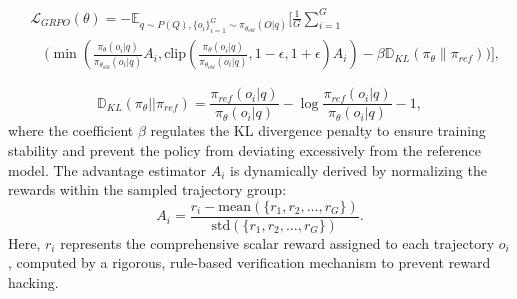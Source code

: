 \documentclass{article}
\begin{document}

\begin{equation}
\begin{aligned}
    &\mathcal{L}_{GRPO}(\theta) = -\mathbb{E}_{q \sim P(Q), \{o_i\}_{i=1}^{G} \sim \pi_{\theta_{old}}(O|q)} \Bigg[ \frac{1}{G} \sum_{i=1}^G \\
    &\quad \Bigg( \min\left( \frac{\pi_\theta(o_i|q)}{\pi_{\theta_{old}}(o_i|q)} A_i, \text{clip}\left(\frac{\pi_\theta(o_i|q)}{\pi_{\theta_{old}}(o_i|q)}, 1-\epsilon, 1+\epsilon\right) A_i \right) - \beta \mathbb{D}_{KL}(\pi_\theta \| \pi_{ref}) \Bigg) \Bigg],
\end{aligned}
\end{equation}


\begin{equation}
\mathbb{D}_{KL}(\pi_\theta||\pi_{ref}) = \frac{\pi_{ref}(o_i|q)}{\pi_\theta(o_i|q)} - \log \frac{\pi_{ref}(o_i|q)}{\pi_\theta(o_i|q)} - 1, 
\end{equation}
where the coefficient $ \beta $ regulates the KL divergence penalty to ensure training stability and prevent the policy from deviating excessively from the reference model. The advantage estimator $ A_{i} $ is dynamically derived by normalizing the rewards within the sampled trajectory group:  
\begin{equation}
A_{i} = \frac{r_i - \text{mean}(\{r_1, r_2, \dots, r_G\})}{\text{std}(\{r_1, r_2, \dots, r_G\})}.
\end{equation}
Here, $ r_i $ represents the comprehensive scalar reward assigned to each trajectory $ o_i $, computed by a rigorous, rule-based verification mechanism to prevent reward hacking.
\end{document}
